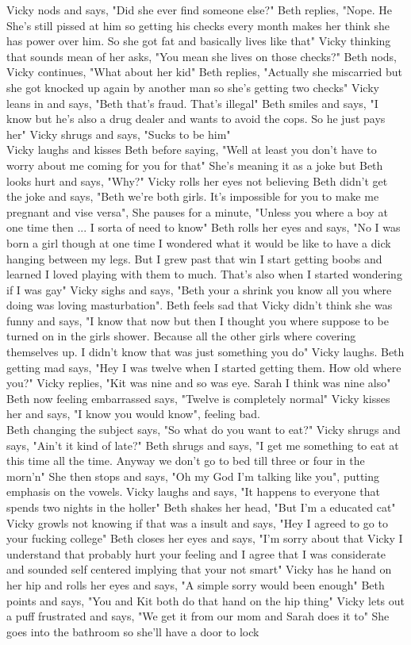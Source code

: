 \documentclass{article}[12px] %
\begin{document}
Vicky nods and says, "Did she ever find someone else?" Beth replies, "Nope. He She's still pissed at him so getting his checks every month makes her think she has power over him. So she got fat and basically lives like that" Vicky thinking that sounds mean of her asks, "You mean she lives on those checks?" Beth nods, Vicky continues, "What about her kid" Beth replies, "Actually she miscarried but she got knocked up again by another man so she's getting two checks" Vicky leans in and says, "Beth that's fraud. That's illegal" Beth smiles and says, "I know but he's also a drug dealer and wants to avoid the cops. So he just pays her" Vicky shrugs and says, "Sucks to be him"\\

Vicky laughs and kisses Beth before saying, "Well at least you don't have to worry about me coming for you for that" She's meaning it as a joke but Beth looks hurt and says, "Why?" Vicky rolls her eyes not believing Beth didn't get the joke and says, "Beth we're both girls. It's impossible for you to make me pregnant and vise versa", She pauses for a minute, "Unless you where a boy at one time then ... I sorta of need to know" Beth rolls her eyes and says, "No I was born a girl though at one time I wondered what it would be like to have a dick hanging between my legs. But I grew past that win I start getting boobs and learned I loved playing with them to much. That's also when I started wondering if I was gay" Vicky sighs and says, "Beth your a shrink you know all you where doing was loving masturbation". Beth feels sad that Vicky didn't think she was funny and says, "I know that now but then I thought you where suppose to be turned on in the girls shower. Because all the other girls where covering themselves up. I didn't know that was just something you do" Vicky laughs. Beth getting mad says, "Hey I was twelve when I started getting them. How old where you?" Vicky replies, "Kit was nine and so was eye. Sarah I think was nine also" Beth now feeling embarrassed says, "Twelve is completely normal" Vicky kisses her and says, "I know you would know", feeling bad.\\

Beth changing the subject says, "So what do you want to eat?" Vicky shrugs and says, "Ain't it kind of late?" Beth shrugs and says, "I get me something to eat at this time all the time. Anyway we don't go to bed till three or four in the morn'n" She then stops and says, "Oh my God I'm talking like you", putting emphasis on the vowels.  Vicky laughs and says, "It happens to everyone that spends two nights in the holler" Beth shakes her head, "But I'm a educated cat" Vicky growls not knowing if that was a insult and says, "Hey I agreed to go to your fucking college" Beth closes her eyes and says, "I'm sorry about that Vicky I understand that probably hurt your feeling and I agree that I was considerate and sounded self centered implying that your not smart" Vicky has he hand on her hip and rolls her eyes and says, "A simple sorry would been enough" Beth points and says, "You and Kit both do that hand on the hip thing" Vicky lets out a puff frustrated and says, "We get it from our mom and Sarah does it to" She goes into the bathroom so she'll have a door to lock
\end{document}

